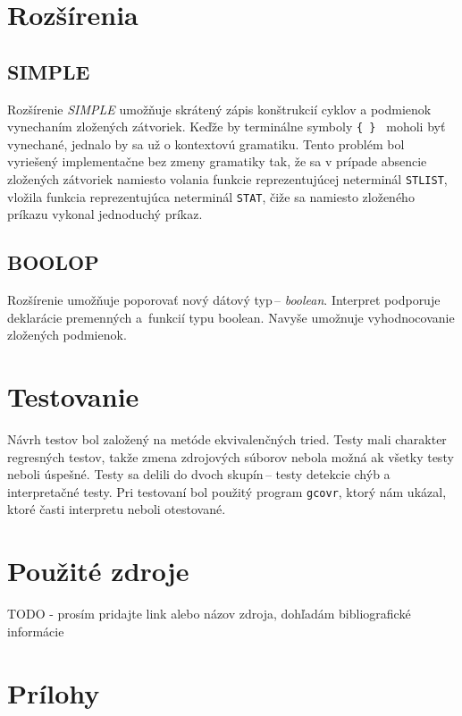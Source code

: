 \documentclass[11pt,a4paper]{article}
\begin{document}
\section{Rozšírenia} 
\label{rozsirenia}

    \subsection{SIMPLE}
    Rozšírenie \emph{SIMPLE} umožňuje skrátený zápis konštrukcií cyklov a podmienok vynechaním zložených zátvoriek. Keďže by terminálne symboly
    \texttt{\{ \} } moholi byť vynechané, jednalo by sa už o kontextovú gramatiku. Tento problém bol vyriešený implementačne bez zmeny
    gramatiky tak, že sa v prípade absencie zložených zátvoriek namiesto volania funkcie reprezentujúcej neterminál \texttt{STLIST}, vložila
    funkcia reprezentujúca neterminál \texttt{STAT}, čiže sa namiesto zloženého príkazu vykonal jednoduchý príkaz.

    \subsection{BOOLOP}
    Rozšírenie umožňuje poporovať nový dátový typ\,-- \emph{boolean}. Interpret podporuje deklarácie premenných a~funkcií typu boolean. Navyše
    umožnuje vyhodnocovanie zložených podmienok.

\section{Testovanie} 
\label{testovanie}
Návrh testov bol založený na metóde ekvivalenčných tried. Testy mali charakter regresných testov, takže zmena zdrojových súborov nebola možná ak
všetky testy neboli úspešné. Testy sa delili do dvoch skupín\,-- testy detekcie chýb a interpretačné testy. Pri testovaní bol použitý program
\texttt{gcovr}, ktorý nám ukázal, ktoré časti interpretu neboli otestované.

\section{Použité zdroje}

TODO - prosím pridajte link alebo názov zdroja, dohľadám bibliografické informácie

\newpage
\section{Prílohy}
\end{document}
